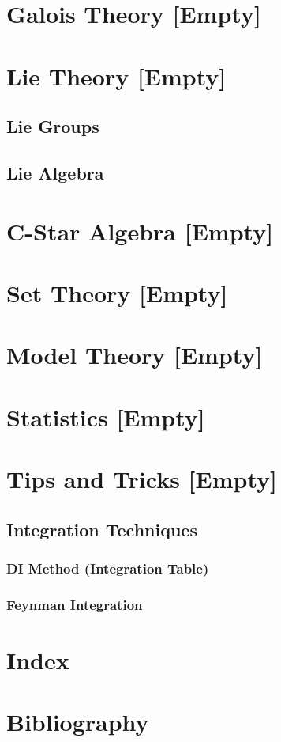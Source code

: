 \documentclass[12pt, english]{book}
\begin{document}
	
	\part{Galois Theory [Empty]} \label{Galois Theory Part}
	
	\part{Lie Theory [Empty]} \label{Lie Algebra Part}
	
	\chapter{Lie Groups}
	
	\chapter{Lie Algebra}
	
	\part{C-Star Algebra [Empty]} \label{C-Star Algebra Part}
	
	\part{Set Theory [Empty]} \label{Set Theory Part}
	
	\part{Model Theory [Empty]} \label{Model Theory Part}
	
	\part{Statistics [Empty]} \label{Statistics Part}
	\part{Tips and Tricks [Empty]} \label{Tips and Tricks Part}
	
	\chapter{Integration Techniques} \label{Integration Techniques Chapter - Tips and Tricks}
	
	\section{DI Method (Integration Table)} \label{DI Method Section - Tips and Tricks}
	
	\section{Feynman Integration} \label{Feynman Integration Section - Tips and Tricks}
	
	\backmatter
	\part{Index} \label{Index Part}
	
	\part{Bibliography}
	
	\typeout{}
	
	
\end{document}
